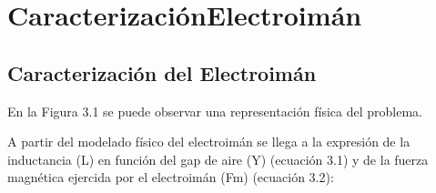 \chapter{CaracterizaciónElectroimán}  \label{cap:CaracterizaciónElectroimán}

\section{Caracterización del Electroimán}

En la Figura 3.1 se puede observar una representación física del problema.


A partir del modelado físico del electroimán se llega a la expresión de la inductancia (L) en función del gap de aire (Y) (ecuación 3.1) y de la fuerza magnética ejercida por el electroimán (Fm) (ecuación 3.2):


